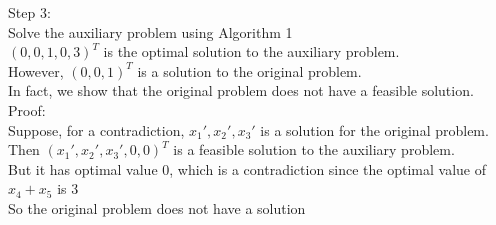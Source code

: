 \documentclass[letterpaper, 12pt]{article}
\newcommand{\red}[1]{{\color{red}{#1}}}
\begin{document}
    Step 3:\\
    Solve the auxiliary problem using Algorithm 1\\
    $(0,0,1,0,3)^T$ is the optimal solution to the auxiliary problem.\\
    However, $(0, 0, 1)^T$ is \red{not} a solution to the original problem.\\
    In fact, we show that the original problem does not have a feasible solution.\\
    \bigskip
    Proof:\\
    Suppose, for a contradiction, $x_1', x_2', x_3'$ is a solution for the original problem.\\
    Then $(x_1', x_2', x_3', 0, 0)^T$ is a feasible solution to the auxiliary problem.\\
    But it has optimal value 0, which is a contradiction since the optimal value of $x_4 + x_5$ is 3\\
    So the original problem does not have a solution\\
    \bigskip
\end{document}
